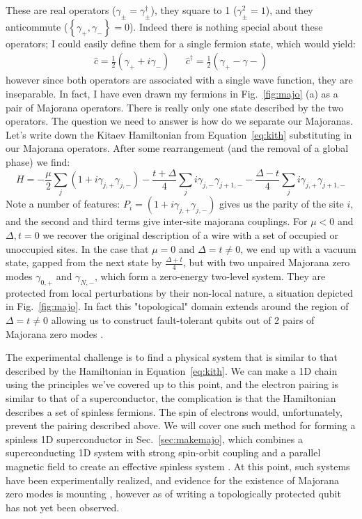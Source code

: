 These are real operators ($\gamma_\pm = \gamma_\pm^\dagger$), they square to 1 ($\gamma_\pm^2 = 1$), and they anticommute ($\left\{\gamma_+, \gamma_-\right\} = 0$).
Indeed there is nothing special about these operators; I could easily define them for a single fermion state, which would yield:
\begin{align}
  \hat c = \frac{1}{2}(\gamma_{+} + i\gamma_{-}) && \hat c^\dagger = \frac{1}{2}(\gamma_{+} - \gamma{-})
\end{align}
however since both operators are associated with a single wave function, they are inseparable. In fact, I have even drawn my fermions in Fig.~\ref{fig:majo} (a) as a
pair of Majorana operators. There is really only one state described by the two operators.
The question we need to answer is how do we separate our Majoranas. Let's write down the Kitaev Hamiltonian from Equation~\ref{eq:kith}
substituting in our Majorana operators. After some rearrangement (and the removal of a global phase) we find:
\begin{equation}
  H = -\frac{\mu}{2}\sum_j(1 + i\gamma_{j,+}\gamma_{j,-}) - \frac{t + \Delta}{4}\sum_j i \gamma_{j,-}\gamma_{j+1,-} - \frac{\Delta - t}{4}\sum_j i \gamma_{j,+}\gamma_{j+1,-}
\end{equation}
Note a number of features: $P_i = (1 + i\gamma_{j,+}\gamma_{j,-})$ gives us the parity of the site $i$, and the second and third terms give inter-site majorana couplings.
For $\mu < 0$ and $\Delta, t = 0$ we recover the original description of a wire with a set of occupied or unoccupied sites. In the case
that $\mu = 0$ and $\Delta = t \neq 0$, we end up with a vacuum state, gapped from the next state by $\tfrac{\Delta+t}{4}$, but with two unpaired
Majorana zero modes $\gamma_{0,+}$ and $\gamma_{N,-}$, which form a zero-energy two-level system. They are protected from local perturbations
by their non-local nature, a situation depicted in Fig.~\ref{fig:majo}. In fact this "topological" domain extends around the region of $\Delta = t \neq 0$
allowing us to construct fault-tolerant qubits out of 2 pairs of Majorana zero modes \cite{RevModPhys.80.1083}.

The experimental challenge is to find a physical system that is similar to that described by the Hamiltonian in Equation~\ref{eq:kith}. We can make a 1D chain using the principles
we've covered up to this point, and the electron pairing is similar to that of a superconductor, the complication is that the Hamiltonian describes
a set of spinless fermions. The spin of electrons would, unfortunately, prevent the pairing described above. We will cover one such method for forming
a spinless 1D superconductor in Sec.~\ref{sec:makemajo}, which combines a superconducting 1D system with strong spin-orbit coupling and a
parallel magnetic field to create an effective spinless system \cite{PhysRevLett.105.077001,PhysRevLett.105.177002}. At this point, such systems
have been experimentally realized, and evidence for the existence of Majorana zero modes is mounting \cite{Mourik1003,s41578-018-0003-1}, however as of writing
a topologically protected qubit has not yet been observed.

